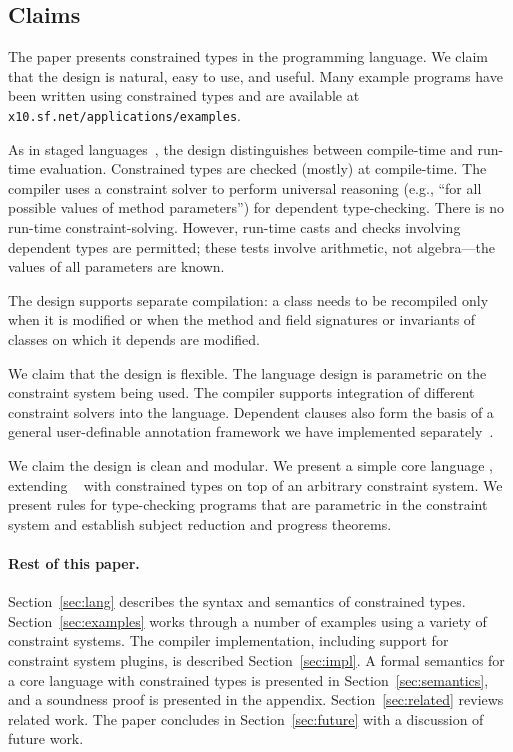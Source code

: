 \subsection{Claims}

The paper presents constrained types in the \Xten{} programming
language.
We claim that the design is natural, easy to use, and useful. Many
example programs have been written using constrained types and are
available at {\tt x10.sf.net/\allowbreak applications/\allowbreak examples}.

As in staged languages~\cite{nielson-multistage,ts97-multistage}, the
design distinguishes between compile-time and run-time
evaluation. Constrained types are checked (mostly) at compile-time.
The compiler uses a constraint solver to perform universal reasoning
(e.g., ``for all possible values of method parameters'') for dependent
type-checking.  There is no run-time constraint-solving.  However,
run-time casts and  checks involving dependent types
are permitted; these tests involve
arithmetic, not algebra---the values of all parameters are known.

The design supports separate compilation: a class needs to be
recompiled only when it is modified or when the method
and field signatures or invariants of classes on which it
depends are modified.

We claim that the design is flexible. The language design is
parametric on the constraint system being used.
The compiler supports
integration of
different constraint solvers into the language.
Dependent clauses  also form
the basis of a general user-definable annotation framework we have
implemented separately~\cite{ns07-x10anno}. 

We claim the design is clean and modular. We present a simple core
language \CFJ, extending \FJ{}~\cite{FJ} with constrained types on top
of an arbitrary constraint system. We present rules for type-checking
\CFJ{} programs that are parametric in the constraint system
and establish subject reduction and progress theorems. 

%

\paragraph{Rest of this paper.}

Section~\ref{sec:lang} describes the syntax and semantics of
constrained types.
Section~\ref{sec:examples} works through a number of
examples using a variety of constraint systems.
The compiler implementation, including support for constraint
system plugins, is described Section~\ref{sec:impl}.
A formal semantics for a core language with constrained types 
is presented in Section~\ref{sec:semantics}, and a soundness
proof is presented in the appendix.
Section~\ref{sec:related} reviews related work.
The paper concludes in Section~\ref{sec:future}
with a discussion of future work.


